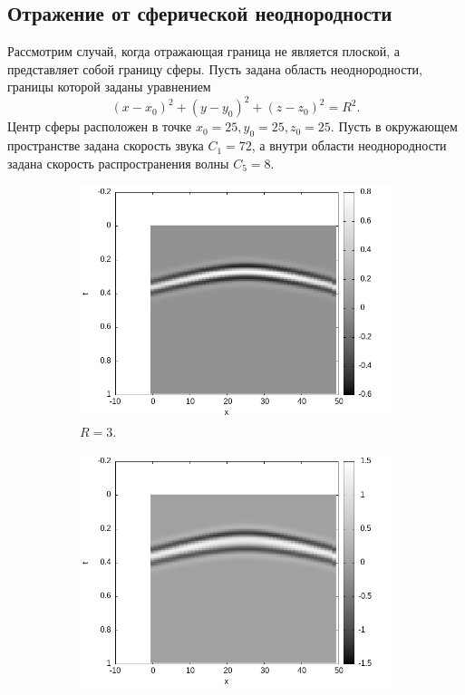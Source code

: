 \documentclass[a4paper, fontsize=14pt]{article}
\begin{document}
	\subsection{Отражение от сферической неоднородности}
	Рассмотрим случай, когда отражающая граница не является плоской, а представляет собой границу сферы. Пусть задана область неоднородности, границы которой заданы уравнением 
	\begin{equation}
		(x-x_0)^2 + (y-y_0)^2 + (z-z_0)^2 = R^2.
	\end{equation}  
	Центр сферы расположен в точке $x_0 = 25, y_0 = 25,z_0 = 25$.
	Пусть в окружающем пространстве задана скорость звука $C_1 = 72$, а внутри области неоднородности задана скорость распространения волны $C_5 = 8$.
	
	\begin{figure}[H]
		\begin{subfigure}{.5\textwidth}
			\centering
			\includegraphics[width=\textwidth]{sphere_3_seism.png}
			\caption{$R=3$.}
			\label{fig:sphere3}
		\end{subfigure}
		\begin{subfigure}{.5\textwidth}
			\centering
			\includegraphics[width=\textwidth]{sphere_5_seism.png}

\end{subfigure}
\end{figure}
\end{document}
